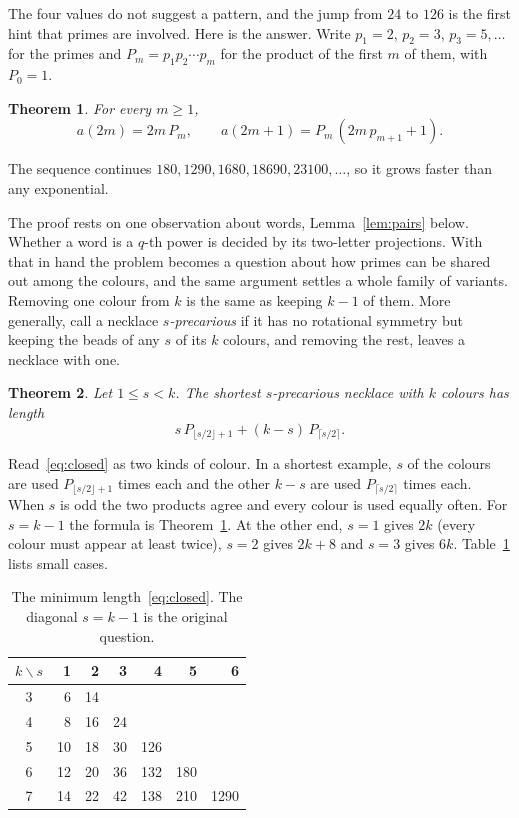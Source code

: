 \documentclass[11pt,a4paper]{article}
\newtheorem{theorem}{Theorem}
\theoremstyle{remark}
\begin{document}
The four values do not suggest a pattern, and the jump from $24$ to
$126$ is the first hint that primes are involved. Here is the answer.
Write $p_1=2$, $p_2=3$, $p_3=5,\dots$ for the primes and
$P_m=p_1p_2\cdots p_m$ for the product of the first $m$ of them, with
$P_0=1$.

\begin{theorem}\label{thm:main}
For every $m\ge1$,
\[
a(2m)=2m\,P_m,\qquad a(2m+1)=P_m\,(2m\,p_{m+1}+1).
\]
\end{theorem}

The sequence continues $180, 1290, 1680, 18690, 23100, \dots$, so it
grows faster than any exponential.

The proof rests on one observation about words, Lemma~\ref{lem:pairs}
below. Whether a word is a $q$-th power is decided by its two-letter
projections. With that in hand the problem becomes a question about how
primes can be shared out among the colours, and the same argument
settles a whole family of variants. Removing one colour from $k$ is the
same as keeping $k-1$ of them. More generally, call a necklace
\emph{$s$-precarious} if it has no rotational symmetry but keeping the
beads of any $s$ of its $k$ colours, and removing the rest, leaves a
necklace with one.

\begin{theorem}\label{thm:general}
Let $1\le s<k$. The shortest $s$-precarious necklace with $k$ colours has
length
\begin{equation}\label{eq:closed}
s\,P_{\lfloor s/2\rfloor+1}+(k-s)\,P_{\lceil s/2\rceil}.
\end{equation}
\end{theorem}

Read~\eqref{eq:closed} as two kinds of colour. In a shortest example,
$s$ of the colours are used $P_{\lfloor s/2\rfloor+1}$ times each and the
other $k-s$ are used $P_{\lceil s/2\rceil}$ times each. When $s$ is odd
the two products agree and every colour is used equally often. For
$s=k-1$ the formula is Theorem~\ref{thm:main}. At the other end, $s=1$
gives $2k$ (every colour must appear at least twice), $s=2$ gives $2k+8$
and $s=3$ gives $6k$. Table~\ref{tab:values} lists small cases.

\begin{table}[ht]
\centering
\begin{tabular}{c|rrrrrr}
\toprule
$k\backslash s$ & 1 & 2 & 3 & 4 & 5 & 6\\
\midrule
3 & 6 & 14 &&&&\\
4 & 8 & 16 & 24 &&&\\
5 & 10 & 18 & 30 & 126 &&\\
6 & 12 & 20 & 36 & 132 & 180 &\\
7 & 14 & 22 & 42 & 138 & 210 & 1290\\
\bottomrule
\end{tabular}
\caption{The minimum length~\eqref{eq:closed}. The diagonal $s=k-1$ is
the original question.}\label{tab:values}
\end{table}
\end{document}
